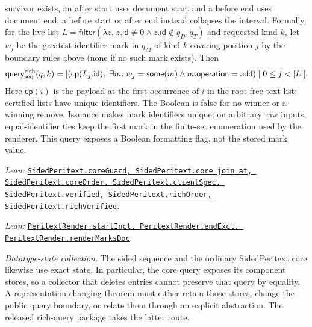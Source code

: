 \documentclass[11pt]{article}
\theoremstyle{definition}
\newcommand{\src}[2]{\href{../../#1}{\texttt{#2}}}
\newcommand{\anchor}[2]{\par\smallskip\noindent\emph{Lean: }\src{#1}{#2}.}
\begin{document}
survivor exists, an after start uses document start and a before end uses
document end; a before start or after end instead collapses the interval.
Formally, for the live list $L=\mathsf{filter}(\lambda z.\;z.\mathsf{id}\ne0
\land z.\mathsf{id}\notin q_D,q_T)$ and requested kind $k$, let $w_j$ be the
greatest-identifier mark in $q_M$ of kind $k$ covering position $j$ by the
boundary rules above (none if no such mark exists). Then
\[
 \mathsf{query}_{\rm seq}^{\rm rich}(q,k)
 =[(\mathsf{cp}(L_j.\mathsf{id}),\ \exists m.\;w_j=\mathsf{some}(m)\land
       m.\mathsf{operation}=\mathsf{add})\mid 0\le j<|L|].
\]
Here $\mathsf{cp}(i)$ is the payload at the first occurrence of $i$ in the
root-free text list; certified lists have unique identifiers.
The Boolean is false for no winner or a winning remove. Issuance makes mark
identifiers unique; on arbitrary raw inputs, equal-identifier ties keep the
first mark in the finite-set enumeration used by the renderer.
This query exposes a Boolean formatting flag, not the stored mark value.
\anchor{Sal/MRDTs/Instances/SidedPeritext.lean}
  {SidedPeritext.coreGuard, SidedPeritext.core\_join\_at,
   SidedPeritext.coreOrder, SidedPeritext.clientSpec,
   SidedPeritext.verified, SidedPeritext.richOrder,
   SidedPeritext.richVerified}
\anchor{Sal/MRDTs/Instances/PeritextRender.lean}
  {PeritextRender.startIncl, PeritextRender.endExcl,
   PeritextRender.renderMarksDoc}

\emph{Datatype-state collection.} The sided sequence and the ordinary SidedPeritext core likewise use exact
state.  In particular, the core query exposes its component stores, so a
collector that deletes entries cannot preserve that query by equality.  A
representation-changing theorem must either retain those stores, change the
public query boundary, or relate them through an explicit abstraction.  The
released rich-query package takes the latter route.
\end{document}
